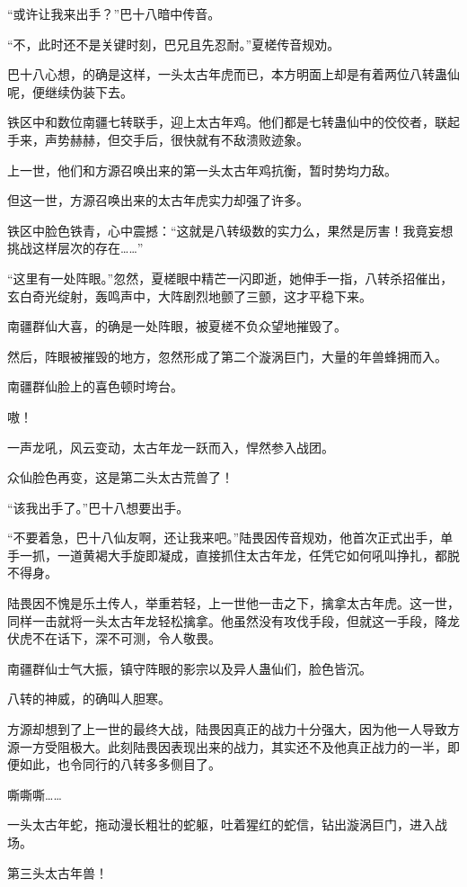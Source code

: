\begin{this_body}
“或许让我来出手？”巴十八暗中传音。

“不，此时还不是关键时刻，巴兄且先忍耐。”夏槎传音规劝。

巴十八心想，的确是这样，一头太古年虎而已，本方明面上却是有着两位八转蛊仙呢，便继续伪装下去。

铁区中和数位南疆七转联手，迎上太古年鸡。他们都是七转蛊仙中的佼佼者，联起手来，声势赫赫，但交手后，很快就有不敌溃败迹象。

上一世，他们和方源召唤出来的第一头太古年鸡抗衡，暂时势均力敌。

但这一世，方源召唤出来的太古年虎实力却强了许多。

铁区中脸色铁青，心中震撼：“这就是八转级数的实力么，果然是厉害！我竟妄想挑战这样层次的存在……”

“这里有一处阵眼。”忽然，夏槎眼中精芒一闪即逝，她伸手一指，八转杀招催出，玄白奇光绽射，轰鸣声中，大阵剧烈地颤了三颤，这才平稳下来。

南疆群仙大喜，的确是一处阵眼，被夏槎不负众望地摧毁了。

然后，阵眼被摧毁的地方，忽然形成了第二个漩涡巨门，大量的年兽蜂拥而入。

南疆群仙脸上的喜色顿时垮台。

嗷！

一声龙吼，风云变动，太古年龙一跃而入，悍然参入战团。

众仙脸色再变，这是第二头太古荒兽了！

“该我出手了。”巴十八想要出手。

“不要着急，巴十八仙友啊，还让我来吧。”陆畏因传音规劝，他首次正式出手，单手一抓，一道黄褐大手旋即凝成，直接抓住太古年龙，任凭它如何吼叫挣扎，都脱不得身。

陆畏因不愧是乐土传人，举重若轻，上一世他一击之下，擒拿太古年虎。这一世，同样一击就将一头太古年龙轻松擒拿。他虽然没有攻伐手段，但就这一手段，降龙伏虎不在话下，深不可测，令人敬畏。

南疆群仙士气大振，镇守阵眼的影宗以及异人蛊仙们，脸色皆沉。

八转的神威，的确叫人胆寒。

方源却想到了上一世的最终大战，陆畏因真正的战力十分强大，因为他一人导致方源一方受阻极大。此刻陆畏因表现出来的战力，其实还不及他真正战力的一半，即便如此，也令同行的八转多多侧目了。

嘶嘶嘶……

一头太古年蛇，拖动漫长粗壮的蛇躯，吐着猩红的蛇信，钻出漩涡巨门，进入战场。

第三头太古年兽！


\end{this_body}
